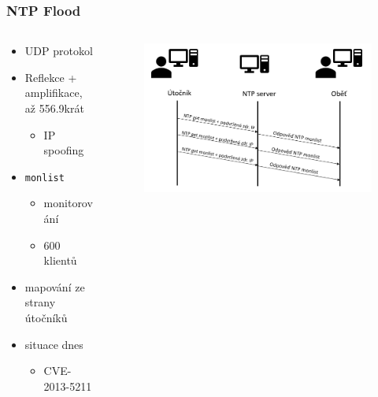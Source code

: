 \documentclass[%
  12pt,       				%
	t,                  %
	aspectratio=1610,   %
	unicode,						%
czech,              %
]{beamer}				    	%
\begin{document}
\begin{frame}
	\frametitle{NTP Flood}
	
	\begin{columns}[T] 								%
		\begin{column}{0.4\textwidth}		%
			\begin{itemize}
				\item UDP protokol
				\item Reflekce + amplifikace, až 556.9krát
				\begin{itemize}
					\item IP spoofing
				\end{itemize}
				\item \texttt{monlist}
				\begin{itemize}
					\item monitorování
					\item 600 klientů
				\end{itemize}
				\item mapování ze strany útočníků
				\item situace dnes
				\begin{itemize}
					\item CVE-2013-5211
				\end{itemize}
			\end{itemize}
		\end{column}
		\begin{column}{0.6\textwidth}		%
			\begin{figure}%
				\centering
				\vspace{1cm}	              %
				\includegraphics[width=0.8\columnwidth]{obrazky/ntp_flood_schema.png}
			\end{figure}
		\end{column}
	\end{columns}											%
\end{frame}
\end{document}
